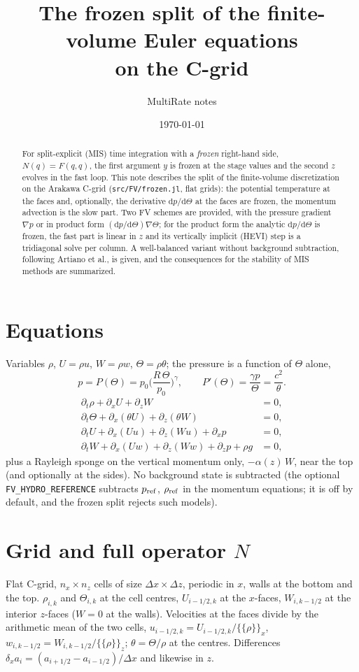 \documentclass[11pt,a4paper]{article}
\title{The frozen split of the finite-volume Euler equations\\on the C-grid}
\author{MultiRate notes}
\date{\today}
\newcommand{\avg}[1]{\{\!\{#1\}\!\}}
\newcommand{\code}[1]{\texttt{#1}}
\begin{document}
\maketitle

\begin{abstract}
For split-explicit (MIS) time integration with a \emph{frozen} right-hand side, $N(q)=F(q,q)$, the
first argument $y$ is frozen at the stage values and the second $z$ evolves in the fast loop. This note
describes the split of the finite-volume discretization on the Arakawa C-grid
(\code{src/FV/frozen.jl}, flat grids): the potential temperature at the faces and, optionally, the
derivative $\mathrm dp/\mathrm d\Theta$ at the faces are frozen, the momentum advection is the slow part. Two FV
schemes are provided, with the pressure gradient $\nabla p$ or in product form $(\mathrm dp/\mathrm d\Theta)\nabla\Theta$; for the
product form the analytic $\mathrm dp/\mathrm d\Theta$ is frozen, the fast part is linear in $z$ and its vertically implicit (HEVI) step is a
tridiagonal solve per column. A well-balanced variant without background subtraction, following
Artiano et al., is given, and the consequences for the stability of MIS methods are summarized.
\end{abstract}

\section{Equations}
Variables $\rho$, $U=\rho u$, $W=\rho w$, $\Theta=\rho\theta$; the pressure is a function of $\Theta$ alone,
\[
p=P(\Theta)=p_0\Big(\frac{R\,\Theta}{p_0}\Big)^{\gamma},\qquad P'(\Theta)=\frac{\gamma p}{\Theta}=\frac{c^2}{\theta}.
\]
\begin{align*}
\partial_t\rho+\partial_xU+\partial_zW&=0,\\
\partial_t\Theta+\partial_x(\theta U)+\partial_z(\theta W)&=0,\\
\partial_tU+\partial_x(Uu)+\partial_z(Wu)+\partial_xp&=0,\\
\partial_tW+\partial_x(Uw)+\partial_z(Ww)+\partial_zp+\rho g&=0,
\end{align*}
plus a Rayleigh sponge on the vertical momentum only, $-\alpha(z)\,W$, near the top (and optionally at the sides). No
background state is subtracted (the optional \code{FV\_HYDRO\_REFERENCE} subtracts $p_{\rm ref}$,
$\rho_{\rm ref}$ in the momentum equations; it is off by default, and the frozen split rejects such models).

\section{Grid and full operator $N$}
Flat C-grid, $n_x\times n_z$ cells of size $\Delta x\times\Delta z$, periodic in $x$, walls at the bottom and
the top. $\rho_{i,k}$ and $\Theta_{i,k}$ at the cell centres, $U_{i-1/2,k}$ at the $x$-faces, $W_{i,k-1/2}$ at the
interior $z$-faces ($W=0$ at the walls). Velocities at the faces divide by the arithmetic mean of the two
cells, $u_{i-1/2,k}=U_{i-1/2,k}/\avg\rho_x$, $w_{i,k-1/2}=W_{i,k-1/2}/\avg\rho_z$; $\theta=\Theta/\rho$ at the centres.
Differences $\delta_x a_{i}=(a_{i+1/2}-a_{i-1/2})/\Delta x$ and likewise in $z$.
\end{document}

